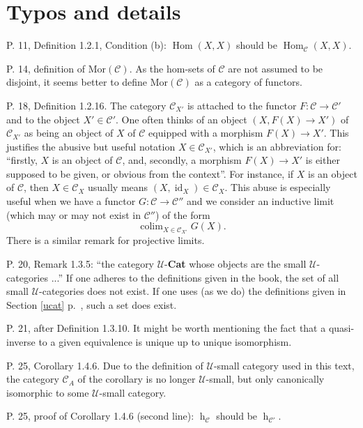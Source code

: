 \documentclass[12pt]{article}
\theoremstyle{remark}%
\newcommand{\n}{\noindent}
\newcommand{\C}{\mathcal C}
\newcommand{\U}{\mathcal U}
\DeclareMathOperator*{\coli}{colim}
\DeclareMathOperator{\hy}{h}
\DeclareMathOperator{\id}{id}
\DeclareMathOperator{\Hom}{Hom}
\begin{document}
\centerline{}
%
\section{Typos and details}%
%
P. 11, Definition 1.2.1, Condition (b): $\Hom(X,X)$ should be $\Hom_{\C}(X,X)$. 

\n P. 14, definition of $\text{Mor}(\C)$. As the hom-sets of $\C$ are not assumed to be disjoint, it seems better to define $\text{Mor}(\C)$ as a category of functors. 


\n P. 18, Definition 1.2.16. The category $\C_{X'}$ is attached to the functor $F:\C\to\C'$ and to the object $X'\in\C'$. One often thinks of an object $(X,F(X)\to X')$ of $\C_{X'}$ as being an object of $X$ of $\C$ equipped with a morphism $F(X)\to X'$. This justifies the abusive but useful notation $X\in\C_{X'}$, which is an abbreviation for: ``firstly, $X$ is an object of $\C$, and, secondly, a morphism $F(X)\to X'$ is either supposed to be given, or obvious from the context''. For instance, if $X$ is an object of $\C$, then $X\in\C_X$ usually means $(X,\id_X)\in\C_X$. This abuse is especially useful when we have a functor $G:\C\to\C''$ and we consider an inductive limit (which may or may not exist in $\C''$) of the form 
%
\begin{equation}\label{convnot}
\coli_{X\in\C_{X'}}G(X).  
\end{equation}
% 
There is a similar remark for projective limits. 


\n P. 20, Remark 1.3.5: ``the category $\U$-\textbf{Cat} whose objects are the small $\U$-categories ...'' If one adheres to the definitions given in the book, the set of all small $\U$-categories does not exist. If one uses (as we do) the definitions given in Section \ref{ucat} p.~\pageref{ucat}, such a set does exist. 

\n P. 21, after Definition 1.3.10. It might be worth mentioning the fact that a quasi-inverse to a given equivalence is unique up to unique isomorphism. 

\n P. 25, Corollary 1.4.6. Due to the definition of $\U$-small category used in this text, the category $\C_A$ of the corollary is no longer $\U$-small, but only canonically isomorphic to some $\U$-small category.

\n P. 25, proof of Corollary 1.4.6 (second line): $\hy_{\C}$ should be $\hy_{\C'}$. 
\end{document}
